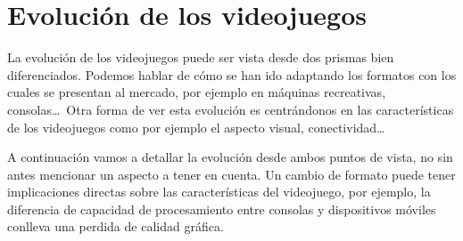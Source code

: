 \begin{figure}[h]
		\centering
\end{figure}
	

\section{Evolución de los videojuegos}

La evolución de los videojuegos puede ser vista desde dos prismas bien diferenciados. Podemos hablar de cómo se han ido adaptando los formatos con los cuales se presentan al mercado, por ejemplo en máquinas recreativas, consolas\ldots\ Otra forma de ver esta evolución es centrándonos en las características de los videojuegos como por ejemplo el aspecto visual, conectividad\ldots\ 
\newline

A continuación vamos a detallar la evolución desde ambos puntos de vista, no sin antes mencionar un aspecto a tener en cuenta. Un cambio de formato puede tener implicaciones directas sobre las características del videojuego, por ejemplo, la diferencia de capacidad de procesamiento entre consolas y dispositivos móviles conlleva una perdida de calidad gráfica.
\newline


